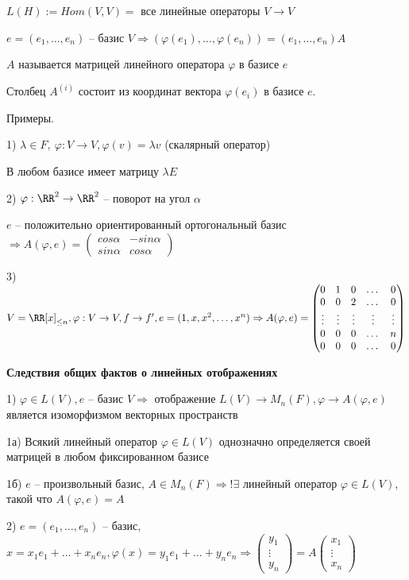 \bigskip
$L(H) := Hom(V, V) = $ {все линейные операторы $V \rightarrow V$}

$e = (e_1, \dots, e_n)$ -- базис $V \Rightarrow (\varphi(e_1), \dots, \varphi(e_n)) = (e_1, \dots, e_n) A$

$A$ называется матрицей линейного оператора $\varphi$ в базисе $e$

Столбец $A^{(i)}$ состоит из координат вектора $\varphi(e_i)$ в базисе $e$.

\bigskip
Примеры.

1) $\lambda \in F, \ \varphi: V \rightarrow V, \varphi(v) = \lambda v$ (скалярный оператор)

В любом базисе имеет матрицу $\lambda E$

2) $\varphi: \RR^2 \rightarrow \RR^2$ -- поворот на угол $\alpha$

$e$ -- положительно ориентированный ортогональный базис $\Rightarrow A(\varphi, e) = \begin{pmatrix} cos \alpha & -sin \alpha \\ sin \alpha & cos \alpha \end{pmatrix}$

3) $V = \RR[x]_{\leq n}, \varphi: V \rightarrow V, f \rightarrow f', e = (1, x, x^2, \dots, x^n) \Rightarrow A(\varphi, e) = \begin{pmatrix} 0 & 1 & 0 & \dots & 0 \\ 0 & 0 & 2 & \dots & 0 \\ \vdots & \vdots & \vdots & \vdots & \vdots \\ 0 & 0 & 0 & \dots & n \\ 0 & 0 & 0 & \dots & 0 \end{pmatrix}$

\bigskip
\textbf{Следствия общих фактов о линейных отображениях}

1) $\varphi \in L(V), e$ -- базис $V \Rightarrow$ отображение $L(V) \rightarrow M_n(F), \varphi \rightarrow A(\varphi, e)$ является изоморфизмом векторных пространств

1а) Всякий линейный оператор $\varphi \in L(V)$ однозначно определяется своей матрицей в любом фиксированном базисе

1б) $e$ -- произвольный базис, $A \in M_n(F) \Rightarrow ! \exists$ линейный оператор $\varphi \in L(V)$, такой что $A(\varphi, e) = A$

2) $e = (e_1, \dots, e_n)$ -- базис, $x = x_1 e_1 + \dots + x_n e_n, \varphi (x) = y_1 e_1 + \dots + y_n e_n \Rightarrow \begin{pmatrix} y_1 \\ \vdots \\ y_n \end{pmatrix} = A \begin{pmatrix} x_1 \\ \vdots \\ x_n
\end{pmatrix}$

